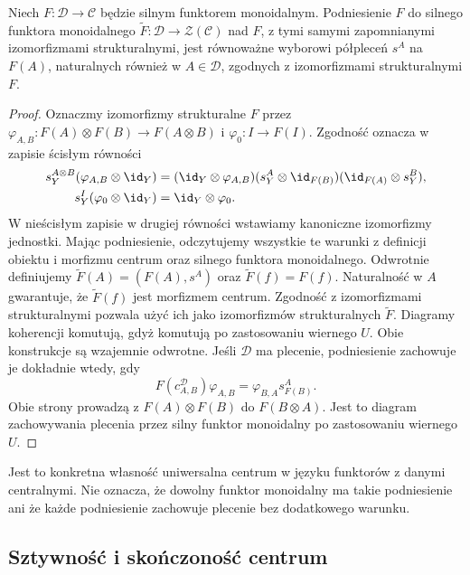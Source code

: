 \begin{stwierdzenie}\label{cat:prop:tf-center-lift}
Niech $F:\mathcal D\to\mathcal C$ będzie silnym funktorem monoidalnym. Podniesienie $F$ do silnego funktora monoidalnego $\widetilde F:\mathcal D\to\mathcal Z(\mathcal C)$ nad $F$, z tymi samymi zapomnianymi izomorfizmami strukturalnymi, jest równoważne wyborowi półpleceń $s^A$ na $F(A)$, naturalnych również w $A\in\mathcal D$, zgodnych z izomorfizmami strukturalnymi $F$.
\end{stwierdzenie}
\begin{proof}
Oznaczmy izomorfizmy strukturalne $F$ przez $\varphi_{A,B}:F(A)\otimes F(B)\to F(A\otimes B)$ i $\varphi_0:I\to F(I)$. Zgodność oznacza w zapisie ścisłym równości
\[
\begin{aligned}
 s^{A\otimes B}_Y(\varphi_{A,B}\otimes\id_Y)
 &= (\id_Y\otimes\varphi_{A,B})
 (s^A_Y\otimes\id_{F(B)})(\id_{F(A)}\otimes s^B_Y),\\
 s^I_Y(\varphi_0\otimes\id_Y)&=\id_Y\otimes\varphi_0.
\end{aligned}
\]
W nieścisłym zapisie w drugiej równości wstawiamy kanoniczne izomorfizmy jednostki. Mając podniesienie, odczytujemy wszystkie te warunki z definicji obiektu i morfizmu centrum oraz silnego funktora monoidalnego. Odwrotnie definiujemy $\widetilde F(A)=(F(A),s^A)$ oraz $\widetilde F(f)=F(f)$. Naturalność w $A$ gwarantuje, że $\widetilde F(f)$ jest morfizmem centrum. Zgodność z izomorfizmami strukturalnymi pozwala użyć ich jako izomorfizmów strukturalnych $\widetilde F$. Diagramy koherencji komutują, gdyż komutują po zastosowaniu wiernego $U$. Obie konstrukcje są wzajemnie odwrotne. Jeśli $\mathcal D$ ma plecenie, podniesienie zachowuje je dokładnie wtedy, gdy
\[
 F(c^{\mathcal D}_{A,B})\varphi_{A,B}
 =\varphi_{B,A}s^A_{F(B)}.
\]
Obie strony prowadzą z $F(A)\otimes F(B)$ do $F(B\otimes A)$. Jest to diagram zachowywania plecenia przez silny funktor monoidalny po zastosowaniu wiernego $U$.
\end{proof}

Jest to konkretna własność uniwersalna centrum w języku funktorów z danymi centralnymi. Nie oznacza, że dowolny funktor monoidalny ma takie podniesienie ani że każde podniesienie zachowuje plecenie bez dodatkowego warunku.

\subsection{Sztywność i skończoność centrum}

